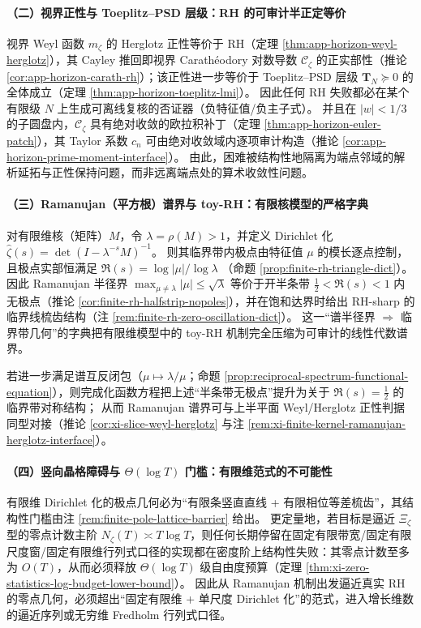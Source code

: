 \paragraph{（二）视界正性与 Toeplitz--PSD 层级：RH 的可审计半正定等价}
视界 Weyl 函数 \(m_{\zeta}\) 的 Herglotz 正性等价于 RH（定理 \ref{thm:app-horizon-weyl-herglotz}），其 Cayley 推回即视界 Carath\'eodory 对数导数 \(\mathscr{C}_{\zeta}\) 的正实部性（推论 \ref{cor:app-horizon-carath-rh}）；该正性进一步等价于 Toeplitz--PSD 层级 \(\mathbf{T}_N\succeq 0\) 的全体成立（定理 \ref{thm:app-horizon-toeplitz-lmi}）。
因此任何 RH 失败都必在某个有限级 \(N\) 上生成可离线复核的否证器（负特征值/负主子式）。
并且在 \(|w|<1/3\) 的子圆盘内，\(\mathscr{C}_{\zeta}\) 具有绝对收敛的欧拉积补丁（定理 \ref{thm:app-horizon-euler-patch}），其 Taylor 系数 \(c_n\) 可由绝对收敛域内逐项审计构造（推论 \ref{cor:app-horizon-prime-moment-interface}）。
由此，困难被结构性地隔离为端点邻域的解析延拓与正性保持问题，而非远离端点处的算术收敛性问题。

\paragraph{（三）Ramanujan（平方根）谱界与 toy-RH：有限核模型的严格字典}
对有限维核（矩阵）\(M\)，令 \(\lambda=\rho(M)>1\)，并定义 Dirichlet 化 \(\widehat{\zeta}(s)=\det(I-\lambda^{-s}M)^{-1}\)。
则其临界带内极点由特征值 \(\mu\) 的模长逐点控制，且极点实部恒满足
\(
\Re(s)=\log|\mu|/\log\lambda
\)
（命题 \ref{prop:finite-rh-triangle-dict}）。
因此 Ramanujan 半径界
\(
\max_{\mu\neq\lambda}|\mu|\le\sqrt{\lambda}
\)
等价于开半条带 \(\tfrac12<\Re(s)<1\) 内无极点（推论 \ref{cor:finite-rh-halfstrip-nopoles}），并在饱和达界时给出 RH-sharp 的临界线梳齿结构（注 \ref{rem:finite-rh-zero-oscillation-dict}）。
这一“谱半径界 \(\Rightarrow\) 临界带几何”的字典把有限维模型中的 toy-RH 机制完全压缩为可审计的线性代数谱界。
\par
若进一步满足谱互反闭包（\(\mu\mapsto \lambda/\mu\)；命题 \ref{prop:reciprocal-spectrum-functional-equation}），则完成化函数方程把上述“半条带无极点”提升为关于 \(\Re(s)=\tfrac12\) 的临界带对称结构；
从而 Ramanujan 谱界可与上半平面 Weyl/Herglotz 正性判据同型对接（推论 \ref{cor:xi-slice-weyl-herglotz} 与注 \ref{rem:xi-finite-kernel-ramanujan-herglotz-interface}）。

\paragraph{（四）竖向晶格障碍与 \texorpdfstring{$\Theta(\log T)$}{Theta(log T)} 门槛：有限维范式的不可能性}
有限维 Dirichlet 化的极点几何必为“有限条竖直直线 + 有限相位等差梳齿”，其结构性门槛由注 \ref{rem:finite-pole-lattice-barrier} 给出。
更定量地，若目标是逼近 \(\Xi_{\zeta}\) 型的零点计数主阶 \(N_{\zeta}(T)\asymp T\log T\)，则任何长期停留在固定有限带宽/固定有限尺度窗/固定有限维行列式口径的实现都在密度阶上结构性失败：其零点计数至多为 \(O(T)\)，从而必须释放 \(\Theta(\log T)\) 级自由度预算（定理 \ref{thm:xi-zero-statistics-log-budget-lower-bound}）。
因此从 Ramanujan 机制出发逼近真实 RH 的零点几何，必须超出“固定有限维 + 单尺度 Dirichlet 化”的范式，进入增长维数的逼近序列或无穷维 Fredholm 行列式口径。

